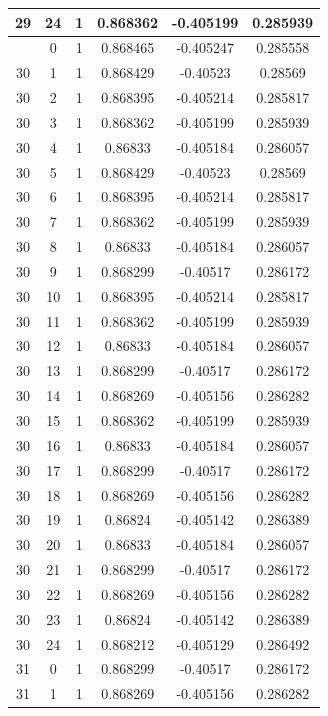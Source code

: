 \documentclass[12pt,a4paper]{article}
\numberwithin{equation}{section}
\numberwithin{figure}{section}
\numberwithin{table}{section}
\begin{document}
\begin{longtable}{|c|c|c|c|c|c|}
29 & 24 & 1 & 0.868362 & -0.405199 & 0.285939 \\ \hline
\pagebreak
30 & 0 & 1 & 0.868465 & -0.405247 & 0.285558 \\ \hline
30 & 1 & 1 & 0.868429 & -0.40523 & 0.28569 \\ \hline
30 & 2 & 1 & 0.868395 & -0.405214 & 0.285817 \\ \hline
30 & 3 & 1 & 0.868362 & -0.405199 & 0.285939 \\ \hline
30 & 4 & 1 & 0.86833 & -0.405184 & 0.286057 \\ \hline
30 & 5 & 1 & 0.868429 & -0.40523 & 0.28569 \\ \hline
30 & 6 & 1 & 0.868395 & -0.405214 & 0.285817 \\ \hline
30 & 7 & 1 & 0.868362 & -0.405199 & 0.285939 \\ \hline
30 & 8 & 1 & 0.86833 & -0.405184 & 0.286057 \\ \hline
30 & 9 & 1 & 0.868299 & -0.40517 & 0.286172 \\ \hline
30 & 10 & 1 & 0.868395 & -0.405214 & 0.285817 \\ \hline
30 & 11 & 1 & 0.868362 & -0.405199 & 0.285939 \\ \hline
30 & 12 & 1 & 0.86833 & -0.405184 & 0.286057 \\ \hline
30 & 13 & 1 & 0.868299 & -0.40517 & 0.286172 \\ \hline
30 & 14 & 1 & 0.868269 & -0.405156 & 0.286282 \\ \hline
30 & 15 & 1 & 0.868362 & -0.405199 & 0.285939 \\ \hline
30 & 16 & 1 & 0.86833 & -0.405184 & 0.286057 \\ \hline
30 & 17 & 1 & 0.868299 & -0.40517 & 0.286172 \\ \hline
30 & 18 & 1 & 0.868269 & -0.405156 & 0.286282 \\ \hline
30 & 19 & 1 & 0.86824 & -0.405142 & 0.286389 \\ \hline
30 & 20 & 1 & 0.86833 & -0.405184 & 0.286057 \\ \hline
30 & 21 & 1 & 0.868299 & -0.40517 & 0.286172 \\ \hline
30 & 22 & 1 & 0.868269 & -0.405156 & 0.286282 \\ \hline
30 & 23 & 1 & 0.86824 & -0.405142 & 0.286389 \\ \hline
30 & 24 & 1 & 0.868212 & -0.405129 & 0.286492 \\ \hline
31 & 0 & 1 & 0.868299 & -0.40517 & 0.286172 \\ \hline
31 & 1 & 1 & 0.868269 & -0.405156 & 0.286282 \\ \hline

\end{longtable}
\end{document}
